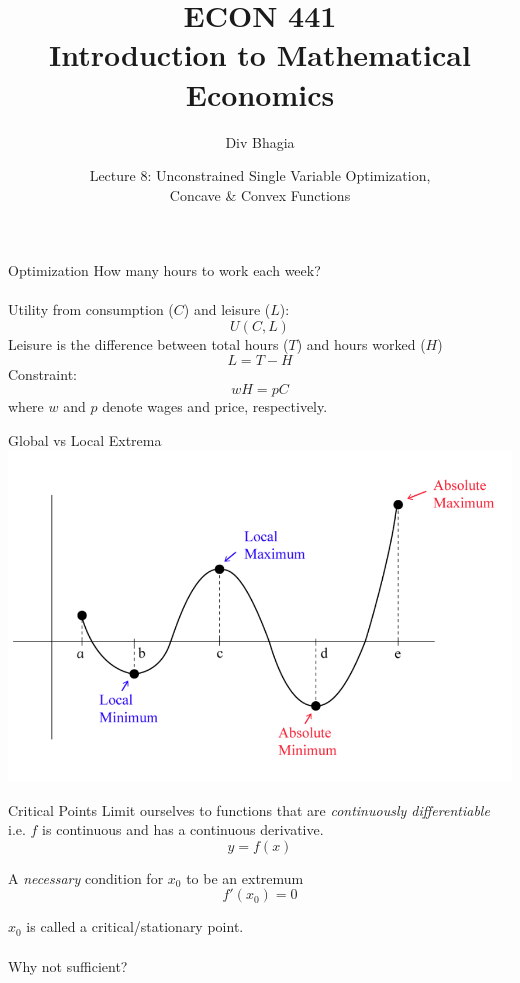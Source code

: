 \documentclass{./../../Latex/teaching_slides}
\begin{document}
\title{ECON 441 \\ \vspace{0.4em} \normalsize Introduction to Mathematical Economics}
\author{Div Bhagia}
\date{Lecture 8: Unconstrained Single Variable Optimization, \\ Concave \& Convex Functions}

\begin{frame}
\maketitle
\end{frame}

\begin{frame}{Optimization}
How many hours to work each week? \\~\\
Utility from consumption ($C$) and leisure ($L$):
$$ U(C,L) $$
Leisure is the difference between total hours ($T$) and hours worked ($H$)
$$L = T-H$$
Constraint:
$$ wH = pC $$
where $w$ and $p$ denote wages and price, respectively.
\end{frame}

\begin{frame}{Global vs Local Extrema}
\centering
\includegraphics[scale=0.375]{global_vs_local.png}
\end{frame}

\begin{frame}{Critical Points}
Limit ourselves to functions that are \textit{continuously differentiable} i.e. $f$ is continuous and has a continuous derivative. 
$$ y = f(x) $$ 

A \textit{necessary} condition for $x_0$ to be an extremum \\
$$f'(x_0) = 0$$ 

$x_0$ is called a critical/stationary point. \\~\\
Why not sufficient?
\end{frame}
\end{document}
